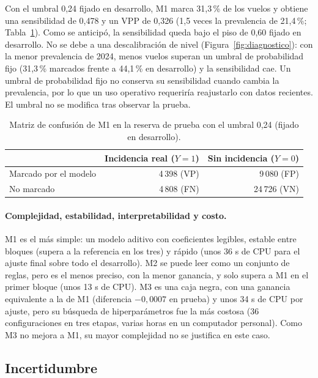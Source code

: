 \documentclass[11pt,a4paper]{article}
\begin{document}
Con el umbral 0,24 fijado en desarrollo, M1 marca 31,3\,\% de los vuelos y obtiene una sensibilidad de 0,478 y un VPP de 0,326 (1,5 veces la prevalencia de 21,4\,\%; Tabla~\ref{tab:confusion}). Como se anticipó, la sensibilidad queda bajo el piso de 0,60 fijado en desarrollo. No se debe a una descalibración de nivel (Figura~\ref{fig:diagnostico}): con la menor prevalencia de 2024, menos vuelos superan un umbral de probabilidad fijo (31,3\,\% marcados frente a 44,1\,\% en desarrollo) y la sensibilidad cae. Un umbral de probabilidad fijo no conserva su sensibilidad cuando cambia la prevalencia, por lo que un uso operativo requeriría reajustarlo con datos recientes. El umbral no se modifica tras observar la prueba.
 
\begin{table}[ht]
\centering
\caption{Matriz de confusión de M1 en la reserva de prueba con el umbral 0,24 (fijado en desarrollo).}
\label{tab:confusion}
\small
\begin{tabularx}{0.8\textwidth}{@{}Xrr@{}}
\toprule
 & Incidencia real ($Y=1$) & Sin incidencia ($Y=0$) \\
\midrule
Marcado por el modelo & 4\,398 (VP) & 9\,080 (FP) \\
No marcado & 4\,808 (FN) & 24\,726 (VN) \\
\bottomrule
\end{tabularx}
\end{table}
 
\paragraph{Complejidad, estabilidad, interpretabilidad y costo.} M1 es el más simple: un modelo aditivo con coeficientes legibles, estable entre bloques (supera a la referencia en los tres) y rápido (unos 36 s de CPU para el ajuste final sobre todo el desarrollo). M2 se puede leer como un conjunto de reglas, pero es el menos preciso, con la menor ganancia, y solo supera a M1 en el primer bloque (unos 13 s de CPU). M3 es una caja negra, con una ganancia equivalente a la de M1 (diferencia $-0{,}0007$ en prueba) y unos 34 s de CPU por ajuste, pero su búsqueda de hiperparámetros fue la más costosa (36 configuraciones en tres etapas, varias horas en un computador personal). Como M3 no mejora a M1, su mayor complejidad no se justifica en este caso.
 
\subsection{Incertidumbre}
 
\end{document}
